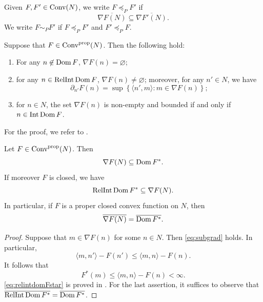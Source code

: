\begin{definition}\label{def:convexPorder}
    Given $F,F'\in \mathrm{Conv}(N)$, we write $F\preceq_P F'$ if
    \[
        \overline{\nabla F(N)}\subseteq \overline{\nabla F'(N)}.
    \]
    We write $F\sim_P F'$ if $F\preceq_P F'$ and $F'\preceq_P F$.
\end{definition}

\begin{theorem}\label{thm:nablaF}
    Suppose that $F\in \mathrm{Conv}^{\mathrm{prop}}(N)$. Then the following hold:
    \begin{enumerate}
        \item\label{itm:thm:nablaF:1} For any $n\not\in \operatorname{Dom} F$, $\nabla F(n)=\varnothing$;
        \item\label{itm:thm:nablaF:2} for any $n\in \operatorname{RelInt}\operatorname{Dom} F$, $\nabla F(n)\neq \varnothing$; moreover, for any $n'\in N$, we have
        \[
            \partial_{n'} F(n)=\sup\left\{\langle n', m \rangle: m\in \nabla F(n)\right\};
        \]
        \item\label{itm:thm:nablaF:3} for $n\in N$, the set $\nabla F(n)$ is non-empty and bounded if and only if $n\in \operatorname{Int} \operatorname{Dom} F$.
    \end{enumerate}
\end{theorem}
For the proof, we refer to \cite[Theorem~23.4]{Roc70}.

\begin{proposition}\label{prop:gradDomFstar}
    Let $F\in \mathrm{Conv}^{\mathrm{prop}}(N)$. Then
    \[
    \nabla F(N)\subseteq \operatorname{Dom} F^*.
    \]
    If moreover $F$ is closed, we have
    \begin{equation}\label{eq:relintdomFstar}
        \operatorname{RelInt} \operatorname{Dom} F^*\subseteq \nabla F(N).
    \end{equation}
    In particular, if $F$ is a proper closed convex function on $N$, then
    \[
    \overline{\nabla F(N)}=\overline{\operatorname{Dom} F^*}.
    \]
\end{proposition}
\begin{proof}
    Suppose that $m\in \nabla F(n)$ for some $n\in N$. Then \eqref{eq:subgrad} holds. In particular,
    \[
    \langle m,n'\rangle -F(n')\leq \langle m,n\rangle-F(n).
    \]
    It follows that
    \[
    F^*(m)\leq  \langle m,n\rangle-F(n)<\infty.
    \]
    \eqref{eq:relintdomFstar} is proved in \cite[Corollary~23.5.1]{Roc70}. For the last assertion, it suffices to observe that $\overline{\operatorname{RelInt} \operatorname{Dom} F^*}=\overline{\operatorname{Dom} F^*}$.
\end{proof}

